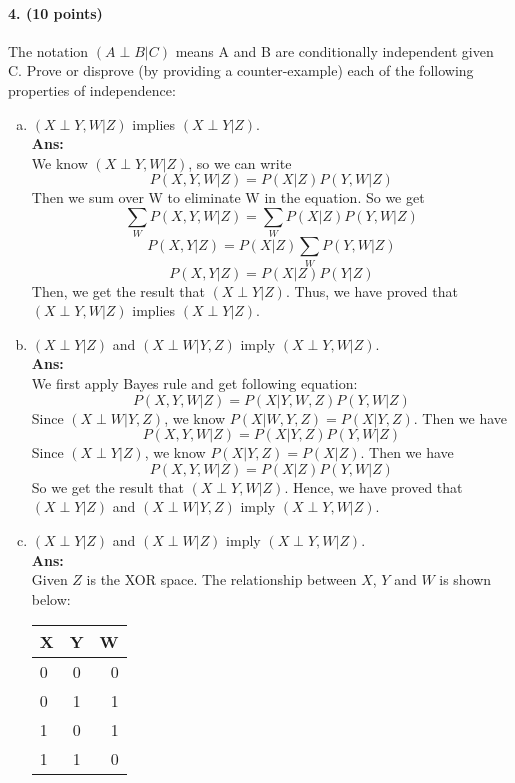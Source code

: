 \documentclass[11pt]{article}
\begin{document}
\paragraph{4. (10 points)} 
The notation $(A \perp B | C)$ means A and B are conditionally independent given C.
Prove or disprove (by providing a counter-example) each of the following properties of independence:
\begin{enumerate}[(a)]
\item $(X\perp  Y, W | Z)$ implies $(X\perp  Y | Z)$.\\
\textbf{Ans:}\\
We know $(X\perp  Y, W | Z)$, so we can write 
$$P(X, Y, W | Z) = P(X|Z)P(Y, W|Z)$$
Then we sum over W to eliminate W in the equation. So we get 
$$\sum_W P(X, Y, W | Z) = \sum_W P(X|Z)P(Y, W|Z)$$
$$P(X, Y|Z) = P(X|Z)\sum_W P(Y, W|Z)$$
$$P(X, Y|Z) = P(X|Z)P(Y|Z)$$
Then, we get the result that $(X\perp  Y | Z)$. Thus, we have proved that $(X\perp  Y, W | Z)$ implies $(X\perp  Y | Z)$.
%
\item $(X\perp Y | Z)$ and $(X \perp W | Y,Z)$ imply $(X\perp Y,W | Z)$.\\
\textbf{Ans:}\\
We first apply Bayes rule and get following equation:
$$P(X, Y, W | Z) = P(X | Y, W, Z)P(Y, W | Z)$$
Since $(X \perp W | Y,Z)$, we know $P(X|W, Y, Z) = P(X|Y, Z)$. Then we have 
$$P(X, Y, W | Z) = P(X | Y, Z)P(Y, W | Z)$$
Since $(X\perp Y | Z)$, we know $P(X|Y, Z) = P(X|Z)$. Then we have 
$$P(X, Y, W | Z) = P(X | Z)P(Y, W | Z)$$
So we get the result that $(X\perp Y,W | Z)$. Hence, we have proved that\\
$(X\perp Y | Z)$ and $(X \perp W | Y,Z)$ imply $(X\perp Y,W | Z)$.
%
\item $(X\perp Y | Z)$ and $(X \perp W | Z)$ imply $(X\perp Y,W | Z)$.\\
\textbf{Ans:}\\
Given $Z$ is the XOR space. The relationship between $X$, $Y$ and $W$ is shown below:\\
\begin{center}
  \begin{tabular}{ | l | c | r |}
    \hline
    X & Y & W \\ \hline \hline
    0 & 0 & 0 \\ \hline 
    0 & 1 & 1 \\ \hline
    1 & 0 & 1 \\ \hline
    1 & 1 & 0 \\ 
    \hline
  \end{tabular}

\end{center}
\end{enumerate}
\end{document}
